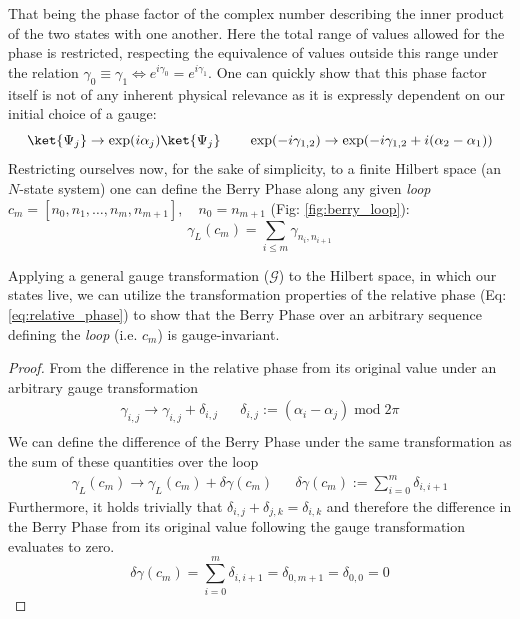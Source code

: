 \documentclass{article}
\begin{document}
That being the phase factor of the complex number describing the inner product of the two states with one another. Here the total range of values allowed for the phase is restricted, respecting the equivalence of values outside this range under the relation $\gamma_{0} \equiv \gamma_{1} \Leftrightarrow e^{i\gamma_{0}} = e^{i\gamma_{1}}$. One can quickly show that this phase factor itself is not of any inherent physical relevance as it is expressly dependent on our initial choice of a gauge:
  \begin{equation*}
    \ket{\Psi_{j}} \rightarrow \exp(i \alpha_{j}) \ket{\Psi_{j}} \quad\quad
    \exp(-i\gamma_{1,2}) \rightarrow \exp(-i\gamma_{1,2} + i(\alpha_{2} - \alpha_{1}))\\
  \end{equation*}
Restricting ourselves now, for the sake of simplicity, to a finite Hilbert space (an $N$-state system) one can define the Berry Phase along any given \textit{loop} $c_m=[n_{0}, n_{1}, \ldots, n_{m}, n_{m+1}], \quad n_{0} = n_{m+1}$ (Fig: \ref{fig:berry_loop}):
  \begin{equation}
    \gamma_{L}(c_m) = \sum_{i \leq m}\gamma_{n_{i}, n_{i+1}}
  \end{equation}

Applying a general gauge transformation ($\mathcal{G}$) to the Hilbert space, in which our states live, we can utilize the transformation properties of the relative phase (Eq: \ref{eq:relative_phase}) to show that the Berry Phase over an arbitrary sequence defining the \textit{loop} (i.e. $c_m$) is gauge-invariant.
\begin{proof}
From the difference in the relative phase from its original value under an arbitrary gauge transformation
\begin{align*}
\gamma_{i, j} \rightarrow \gamma_{i, j} + \delta_{i, j} && \delta_{i, j} := (\alpha_i - \alpha_{j}) \; \mathrm{mod} \; 2\pi \\
\end{align*}
We can define the difference of the Berry Phase under the same transformation as the sum of these quantities over the loop
\begin{align*}
\gamma_{L}(c_m) \rightarrow \gamma_{L}(c_m) + \delta\gamma(c_m) && \delta\gamma(c_m) := \sum_{i=0}^{m}\delta_{i,i+1} 
\end{align*}
Furthermore, it holds trivially that $\delta_{i, j} + \delta_{j, k} = \delta_{i, k}$ and therefore the difference in the Berry Phase from its original value following the gauge transformation evaluates to zero.
\begin{equation*}
  \delta\gamma(c_m) = \sum_{i=0}^{m}\delta_{i,i+1} = \delta_{0,m + 1} = \delta_{0, 0} = 0
\end{equation*}
\end{proof}
\end{document}
